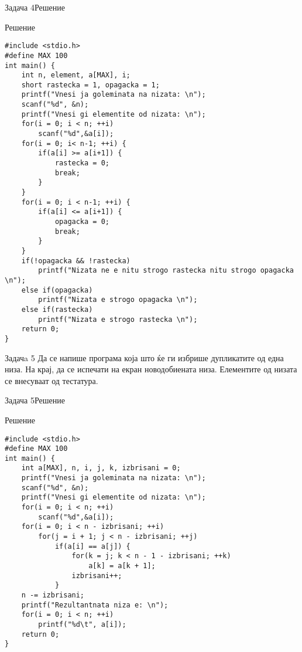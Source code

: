 \begin{frame}[fragile,shrink=10]{Задача 4}{Решение} 
\begin{exampleblock}{Решение}
\begin{lstlisting}
#include <stdio.h>
#define MAX 100
int main() {
    int n, element, a[MAX], i;
    short rastecka = 1, opagacka = 1;
    printf("Vnesi ja goleminata na nizata: \n");
    scanf("%d", &n);
    printf("Vnesi gi elementite od nizata: \n");
    for(i = 0; i < n; ++i)
        scanf("%d",&a[i]);
    for(i = 0; i< n-1; ++i) {
        if(a[i] >= a[i+1]) {
            rastecka = 0;
            break;
        }
    }    
    for(i = 0; i < n-1; ++i) {
        if(a[i] <= a[i+1]) {
            opagacka = 0;
            break;
        }
    }
    if(!opagacka && !rastecka)
        printf("Nizata ne e nitu strogo rastecka nitu strogo opagacka \n");
    else if(opagacka)
        printf("Nizata e strogo opagacka \n");
    else if(rastecka)
        printf("Nizata e strogo rastecka \n");
    return 0;
}
\end{lstlisting}
\end{exampleblock}
\end{frame}

\begin{frame}{Задачa 5}
Да се напише програма која што ќе ги избрише дупликатите од една низа. На крај,
да се испечати на екран новодобиената низа. Елементите од низата се внесуваат од тестатура.
\end{frame}

\begin{frame}[fragile]{Задача 5}{Решение} 
\begin{exampleblock}{Решение}
\begin{lstlisting}
#include <stdio.h>
#define MAX 100
int main() {
    int a[MAX], n, i, j, k, izbrisani = 0;
    printf("Vnesi ja goleminata na nizata: \n");
    scanf("%d", &n);
    printf("Vnesi gi elementite od nizata: \n");
    for(i = 0; i < n; ++i)
        scanf("%d",&a[i]);
    for(i = 0; i < n - izbrisani; ++i)
        for(j = i + 1; j < n - izbrisani; ++j)
            if(a[i] == a[j]) {
                for(k = j; k < n - 1 - izbrisani; ++k)
                    a[k] = a[k + 1];
                izbrisani++;
            }
    n -= izbrisani;
    printf("Rezultantnata niza e: \n");
    for(i = 0; i < n; ++i)
        printf("%d\t", a[i]);
    return 0;
}
\end{lstlisting}
\end{exampleblock}
\end{frame}

